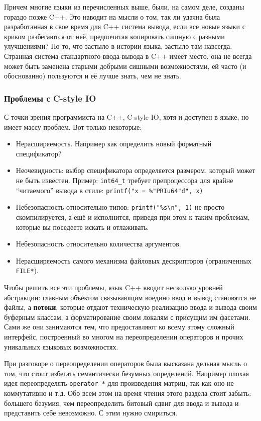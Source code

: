 \documentclass[a4paper,12pt,oneside]{article}
\begin{document}
Причем многие языки из перечисленных выше, были, на самом деле, созданы гораздо позже C++. Это наводит на мысли о том, так ли удачна была разработанная в свое время для C++ система вывода, если все новые языки с криком разбегаются от неё, предпочитая копировать сишную с разными улучшениями? Но то, что застыло в истории языка, застыло там навсегда. Странная система стандартного ввода-вывода в C++ имеет место, она не всегда может быть заменена старыми добрыми сишными возможностями, ей часто (и обоснованно) пользуются и её лучше знать, чем не знать.

\subsubsection{Проблемы с C-style IO}

С точки зрения программиста на C++, C-style IO, хотя и доступен в языке, но имеет массу проблем. Вот только некоторые:

\begin{itemize}
\item Нерасширяемость. Например как определить новый форматный спецификатор?
\item Неочевидность: выбор спецификатора определяется размером, который может не быть известен. Пример: \lstinline!int64_t! требует препроцессора для крайне ``читаемого'' вывода в стиле: \lstinline!printf("x = %"PRIu64"d", x)!
\item Небезопасность относительно типов: \lstinline!printf("%s\n", 1)! не просто скомпилируется, а ещё и исполнится, приведя при этом к таким проблемам, которые вы поседеете искать и отлаживать.
\item Небезопасность относительно количества аргументов.
\item Нерасширяемость самого механизма файловых дескрипторов (ограниченных \lstinline!FILE*!).
\end{itemize}

Чтобы решить все эти проблемы, язык C++ вводит несколько уровней абстракции: главным объектом связывающим воедино ввод и вывод становятся не файлы, а \textbf{потоки}, которые отдают техническую реализацию ввода и вывода своим буферным классам, а форматирование своим локалям с присущим им фасетами. Сами же они занимаются тем, что предоставляют ко всему этому сложный интерфейс, построенный во многом на переопределении операторов и прочих уникальных языковых возможностях.

При разговоре о переопределении операторов была высказана дельная мысль о том, что стоит избегать семантически безумных определений. Например плохая идея переопределять \lstinline!operator *! для произведения матриц, так как оно не коммутативно и т.д. Обо всем этом на время чтения этого раздела стоит забыть: большего безумия, чем переопределить битовый сдвиг для ввода и вывода и представить себе невозможно. С этим нужно смириться.
\end{document}
